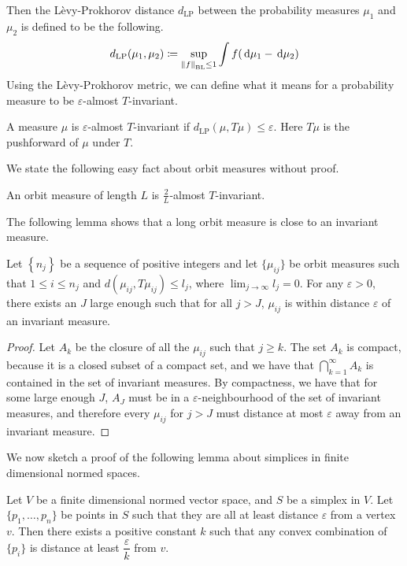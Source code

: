 Then the Lèvy-Prokhorov distance $d_{\mathrm{LP}}$ between the probability measures $\mu_1$ and $\mu_2$ is defined to be the following.
\begin{align*}
  d_{\mathrm{LP}}(\mu_1, \mu_2) \coloneqq \sup_{\left\lVert f\right\rVert_{\mathrm{BL}} \leq 1} \int f (\mathrm{\,d} \mu_1 - \mathrm{\,d} \mu_2)
\end{align*}
Using the Lèvy-Prokhorov metric, we can define what it means for a probability measure to be $\varepsilon$-almost $T$-invariant.
\begin{definition}
  A measure $\mu$ is $\varepsilon$-almost $T$-invariant if $d_{\mathrm{LP}}(\mu, T \mu) \leq \varepsilon$. Here $T \mu$ is the pushforward of $\mu$ under $T$.
\end{definition}
We state the following easy fact about orbit measures without proof.
\begin{fact}
  An orbit measure of length $L$ is $\frac{2}{L}$-almost $T$-invariant.
\end{fact}
The following lemma shows that a long orbit measure is close to an invariant measure.
\begin{lemma}
  \label{lem:long-orbit-is-almost-invariant}
  Let $\left\{ n_j \right\}$ be a sequence of positive integers and let $\{\mu_{ij}\}$ be orbit measures such that $1 \leq i \leq n_j$ and $d(\mu_{ij}, T{\mu}_{ij}) \leq l_j$, where $\lim_{j \to \infty} l_j = 0$.
  For any $\varepsilon > 0$, there exists an $J$ large enough such that for all $j > J$, $\mu_{ij}$ is within distance $\varepsilon$ of an invariant measure.
\end{lemma}
\begin{proof}
  Let $A_k$ be the closure of all the $\mu_{ij}$ such that $j \geq k$.
  The set $A_k$ is compact, because it is a closed subset of a compact set, and we have that $\bigcap_{k=1}^{\infty} A_k$ is contained in the set of invariant measures.
  By compactness, we have that for some large enough $J$, $A_J$ must be in a $\varepsilon$-neighbourhood of the set of invariant measures, and therefore every $\mu_{ij}$ for $j > J$ must distance at most $\varepsilon$ away from an invariant measure.
\end{proof}
We now sketch a proof of the following lemma about simplices in finite dimensional normed spaces.
\begin{lemma}
  \label{lem:finite-normed}
  Let $V$ be a finite dimensional normed vector space, and $S$ be a simplex in $V$.
  Let $\{p_1, \ldots, p_n\}$ be points in $S$ such that they are all at least distance $\varepsilon$ from a vertex $v$.
  Then there exists a positive constant $k$ such that any convex combination of $\{p_i\}$ is distance at least $\dfrac{\varepsilon}{k}$ from $v$.
\end{lemma}

